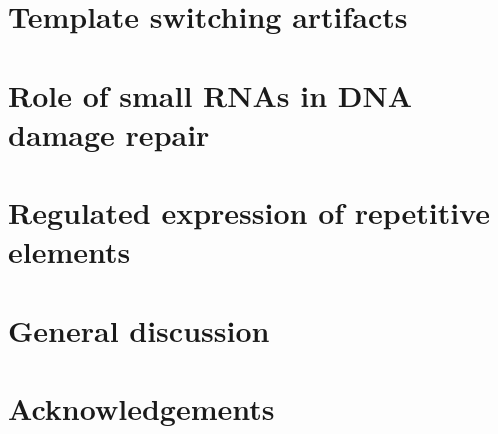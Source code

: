 \documentclass[10pt,a4paper]{report}
\begin{document}
\chapter{Template switching artifacts}\label{template_switching}



\chapter{Role of small RNAs in DNA damage repair}\label{ddrna}



%
%

%
%

\chapter{Regulated expression of repetitive elements}\label{repeat}


%

\chapter{General discussion}\label{discussion}


\chapter*{Acknowledgements}




\end{document}
